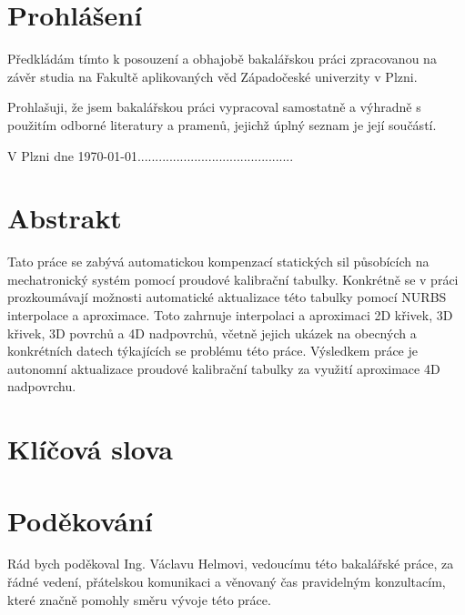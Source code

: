
\vspace*{\fill}
\section*{Prohlášení}
Předkládám tímto k posouzení a obhajobě bakalářskou práci zpracovanou
na závěr studia na Fakultě aplikovaných věd Západočeské univerzity v Plzni.
\par
Prohlašuji, že jsem bakalářskou práci vypracoval samostatně a výhradně s použitím odborné literatury
a pramenů, jejichž úplný seznam je její součástí.
\par
\vspace{5mm}
V Plzni dne \today \hfill ............................................
\vspace*{\fill}
\newpage
\section*{Abstrakt}
Tato práce se zabývá automatickou kompenzací statických sil působících na mechatronický systém pomocí proudové kalibrační tabulky. Konkrétně se v práci prozkoumávají možnosti automatické aktualizace této tabulky pomocí NURBS interpolace a aproximace. Toto zahrnuje interpolaci a aproximaci 2D křivek, 3D křivek, 3D povrchů a 4D nadpovrchů, včetně jejich ukázek na obecných a konkrétních datech týkajících se problému této práce. Výsledkem práce je autonomní aktualizace proudové kalibrační tabulky za využití aproximace 4D nadpovrchu.
\section*{Klíčová slova}
\section*{Poděkování}
Rád bych poděkoval Ing. Václavu Helmovi, vedoucímu této bakalářské práce, za řádné vedení, přátelskou komunikaci a věnovaný čas pravidelným konzultacím, které značně pomohly směru vývoje této práce.
\newpage
